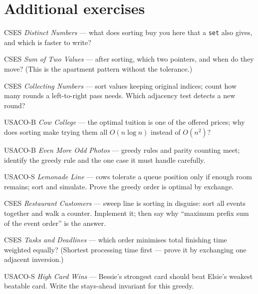 \section{Additional exercises}
\begin{exercise}[easy] CSES \emph{Distinct Numbers} --- what does sorting
buy you here that a \texttt{set} also gives, and which is faster to
write?
\end{exercise}
\begin{exercise}[easy] CSES \emph{Sum of Two Values} --- after sorting,
which two pointers, and when do they move? (This is the apartment
pattern without the tolerance.)
\end{exercise}
\begin{exercise}[easy] CSES \emph{Collecting Numbers} --- sort values
keeping original indices; count how many rounds a left-to-right pass
needs. Which adjacency test detects a new round?
\end{exercise}
\begin{exercise}[easy] USACO-B \emph{Cow College} --- the optimal tuition
is one of the offered prices; why does sorting make trying them all
$O(n\log n)$ instead of $O(n^2)$?
\end{exercise}
\begin{exercise}[easy] USACO-B \emph{Even More Odd Photos} --- greedy
rules and parity counting meet; identify the greedy rule and the one
case it must handle carefully.
\end{exercise}
\begin{exercise}[easy] USACO-S \emph{Lemonade Line} --- cows tolerate a
queue position only if enough room remains; sort and simulate. Prove the
greedy order is optimal by exchange.
\end{exercise}
\begin{exercise}[medium] CSES \emph{Restaurant Customers} --- sweep line
is sorting in disguise: sort all events together and walk a counter.
Implement it; then say why ``maximum prefix sum of the event order'' is
the answer.
\end{exercise}
\begin{exercise}[medium] CSES \emph{Tasks and Deadlines} --- which order
minimises total finishing time weighted equally? (Shortest processing
time first --- prove it by exchanging one adjacent inversion.)
\end{exercise}
\begin{exercise}[medium] USACO-S \emph{High Card Wins} --- Bessie's
strongest card should beat Elsie's weakest beatable card. Write the
stays-ahead invariant for this greedy.
\end{exercise}
